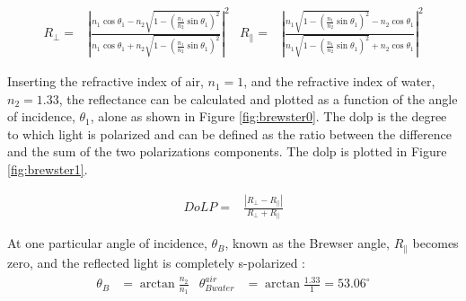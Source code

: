 \begin{align}
    R_\perp =         & \left|{\frac {n_{1}\cos \theta _1-n_{2}{\sqrt {1-\left({\frac {n_{1}}{n_{2}}}\sin \theta _1\right)^{2}}}}{n_{1}\cos \theta _1+n_{2}{\sqrt {1-\left({\frac {n_{1}}{n_{2}}}\sin \theta _1\right)^{2}}}}}\right|^{2}
                      &
    R_\parallel     = & \left|{\frac {n_{1}{\sqrt {1-\left({\frac {n_{1}}{n_{2}}}\sin \theta _1\right)^{2}}}-n_{2}\cos \theta _1}{n_{1}{\sqrt {1-\left({\frac {n_{1}}{n_{2}}}\sin \theta _1\right)^{2}}}+n_{2}\cos \theta _1}}\right|^{2}
\end{align}


Inserting the refractive index of air, $n_1 = 1$, and the refractive index of water, $n_2 = 1.33$, the reflectance can be calculated and plotted as a function of the angle of incidence, $\theta_1$, alone as shown in Figure \ref{fig:brewster0}.
The \gls{dolp} is the degree to which light is polarized and can be defined as the ratio between the difference and the sum of the two polarizations components.
The \gls{dolp} is plotted in Figure \ref{fig:brewster1}.

\begin{align}
    DoLP= & \frac{\left | R_\perp - R_\parallel \right |}{R_\perp + R_\parallel}
\end{align}

At one particular angle of incidence, $\theta_B$, known as the Brewser angle, $R_\parallel$ becomes zero, and the reflected light is completely s-polarized \cite{BrewsterAngle2024}:
\begin{align}
    \theta_B & = \arctan{\frac{n_2}{n_1}} & \theta^{air}_{Bwater} & = \arctan{\frac{1.33}{1}} = 53.06^\circ
\end{align}

